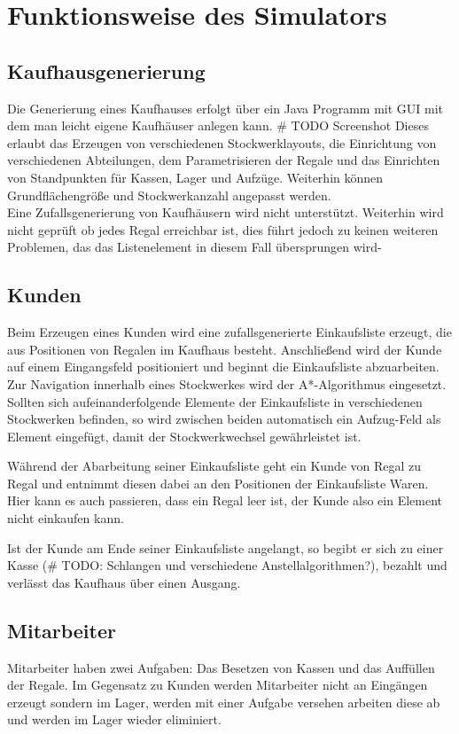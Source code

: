\section{Funktionsweise des Simulators}

\subsection{Kaufhausgenerierung}
Die Generierung eines Kaufhauses erfolgt über ein Java Programm mit GUI mit dem man leicht eigene Kaufhäuser anlegen kann. \# TODO Screenshot
Dieses erlaubt das Erzeugen von verschiedenen Stockwerklayouts, die Einrichtung von verschiedenen Abteilungen, dem Parametrisieren der Regale und das Einrichten von Standpunkten für Kassen, Lager und Aufzüge. Weiterhin können Grundflächengröße und Stockwerkanzahl angepasst werden.\\Eine Zufallsgenerierung von Kaufhäusern wird nicht unterstützt. Weiterhin wird nicht geprüft ob jedes Regal erreichbar ist, dies führt jedoch zu keinen weiteren Problemen, das das Listenelement in diesem Fall übersprungen wird-

\subsection{Kunden}
Beim Erzeugen eines Kunden wird eine zufallsgenerierte Einkaufsliste erzeugt, die aus Positionen von Regalen im Kaufhaus besteht. Anschließend wird der Kunde auf einem Eingangsfeld positioniert und beginnt die Einkaufsliste abzuarbeiten. Zur Navigation innerhalb eines Stockwerkes wird der A*-Algorithmus eingesetzt. Sollten sich aufeinanderfolgende Elemente der Einkaufsliste in verschiedenen Stockwerken befinden, so wird zwischen beiden automatisch ein Aufzug-Feld als Element eingefügt, damit der Stockwerkwechsel gewährleistet ist.

Während der Abarbeitung seiner Einkaufsliste geht ein Kunde von Regal zu Regal und entnimmt diesen dabei an den Positionen der Einkaufsliste Waren. Hier kann es auch passieren, dass ein Regal leer ist, der Kunde also ein Element nicht einkaufen kann.

Ist der Kunde am Ende seiner Einkaufsliste angelangt, so begibt er sich zu einer Kasse (\# TODO: Schlangen und verschiedene Anstellalgorithmen?), bezahlt und verlässt das Kaufhaus über einen Ausgang.

\subsection{Mitarbeiter}
Mitarbeiter haben zwei Aufgaben: Das Besetzen von Kassen und das Auffüllen der Regale. Im Gegensatz zu Kunden werden Mitarbeiter nicht an Eingängen erzeugt sondern im Lager, werden mit einer Aufgabe versehen arbeiten diese ab und werden im Lager wieder eliminiert.

